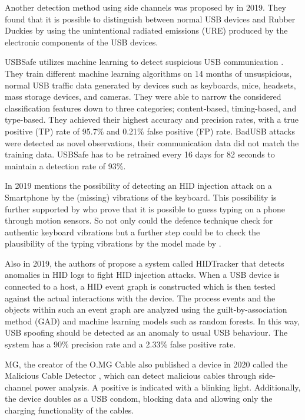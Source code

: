 Another detection method using side channels was proposed by \cite{ibrahimRFDNAFingerprintingDetection2019} in 2019. They found that it is possible to distinguish between normal USB devices and Rubber Duckies by using the unintentional radiated emissions (URE) produced by the electronic components of the USB devices. 

USBSafe utilizes machine learning to detect suspicious USB communication \cite{kharrazUSBESAFEEndPointSolution2019}. They train different machine learning algorithms on 14 months of unsuspicious, normal USB traffic data generated by devices such as keyboards, mice, headsets, mass storage devices, and cameras. They were able to narrow the considered classification features down to three categories; content-based, timing-based, and type-based. They achieved their highest accuracy and precision rates, with a true positive (TP) rate of 95.7\% and 0.21\% false positive (FP) rate. BadUSB attacks were detected as novel observations, their communication data did not match the training data.
USBSafe has to be retrained every 16 days for 82 seconds to maintain a detection rate of 93\%.

In 2019 \cite{bojovicRisingThreatHardware2019} mentions the possibility of detecting an HID injection attack on a Smartphone by the (missing) vibrations of the keyboard. This possibility is further supported by \cite{zhuangKeyboardAcousticEmanations2009} who prove that it is possible to guess typing on a phone through motion sensors. So not only could the defence technique check for authentic keyboard vibrations but a further step could be to check the plausibility of the typing vibrations by the model made by \cite{zhuangKeyboardAcousticEmanations2009}. 

Also in 2019, the authors of \cite{IdentifyingHIDbasedAttacks2019} propose a system called HIDTracker that detects anomalies in HID logs to fight HID injection attacks. When a USB device is connected to a host, a HID event graph is constructed which is then tested against the actual interactions with the device. The process events and the objects within such an event graph are analyzed using the guilt-by-association method (GAD) and machine learning models such as random forests. In this way, USB spoofing should be detected as an anomaly to usual USB behaviour. The system has a 90\% precision rate and a 2.33\% false positive rate. 

MG, the creator of the O.MG Cable also published a device in 2020 called the Malicious Cable Detector \cite{hak5MaliciousCableDetector}, which can detect malicious cables through side-channel power analysis. A positive is indicated with a blinking light. Additionally, the device doubles as a USB condom, blocking data and allowing only the charging functionality of the cables. 

